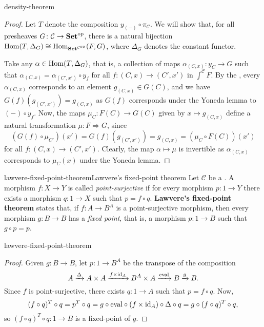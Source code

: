 \begin{example}{density-theorem}
    \begin{proof}
        Let $T$ denote the composition $y_{(-)} \circ \pi_\mathcal{C}$. We will show that, for all presheaves $G \colon \mathcal{C} \to \textbf{Set}^\textup{op}$, there is a natural bijection $\operatorname{Hom}(T, \Delta_G) \cong \operatorname{Hom}_{\textbf{Set}^{\mathcal{C}^\textup{op}}}(F, G)$, where $\Delta_G$ denotes the constant functor.
        
        Take any $\alpha \in \operatorname{Hom}(T, \Delta_G)$, that is, a collection of maps $\alpha_{(C, x)} \colon y_C \to G$ such that $\alpha_{(C, x)} = \alpha_{(C', x')} \circ y_f$ for all $f \colon (C, x) \to (C', x')$ in $\int^\mathcal{C} F$. By the , every $\alpha_{(C, x)}$ corresponds to an element $g_{(C, x)} \in G(C)$, and we have $G(f)(g_{(C', x')}) = g_{(C, x)}$ as $G(f)$ corresponds under the Yoneda lemma to $(-) \circ y_f$. Now, the maps $\mu_C \colon F(C) \to G(C)$ given by $x \mapsto g_{(C, x)}$ define a natural transformation $\mu : F \Rightarrow G$, since
        \[ (G(f) \circ \mu_{C'})(x') = G(f)(g_{(C', x')}) = g_{(C, x)} = (\mu_C \circ F(C))(x') \]
        for all $f \colon (C, x) \to (C', x')$. Clearly, the map $\alpha \mapsto \mu$ is invertible as $\alpha_{(C, x)}$ corresponds to $\mu_C(x)$ under the Yoneda lemma.
    \end{proof}
\end{example}

\begin{topic}{lawvere-fixed-point-theorem}{Lawvere's fixed-point theorem}
    Let $\mathcal{C}$ be a . A morphism $f \colon X \to Y$ is called \textit{point-surjective} if for every morphism $p \colon 1 \to Y$ there exists a morphism $q \colon 1 \to X$ such that $p = f \circ q$. \textbf{Lawvere's fixed-point theorem} states that, if $f \colon A \to B^A$ is a point-surjective morphism, then every morphism $g \colon B \to B$ has a \textit{fixed point}, that is, a morphism $p \colon 1 \to B$ such that $g \circ p = p$.
\end{topic}

\begin{example}{lawvere-fixed-point-theorem}
    \begin{proof}
        Given $g \colon B \to B$, let $p \colon 1 \to B^A$ be the transpose of the composition
        \[ A \xrightarrow{\Delta} A \times A \xrightarrow{f \times \textup{id}_A} B^A \times A \xrightarrow{\textup{eval}} B \xrightarrow{g} B . \]
        Since $f$ is point-surjective, there exists $q \colon 1 \to A$ such that $p = f \circ q$. Now,
        \[ (f \circ q)^T \circ q = p^T \circ q = g \circ \textup{eval} \circ (f \times \textup{id}_A) \circ \Delta \circ q = g \circ (f \circ q)^T \circ q , \]
        so $(f \circ q)^T \circ q \colon 1 \to B$ is a fixed-point of $g$.
    \end{proof}
\end{example}

